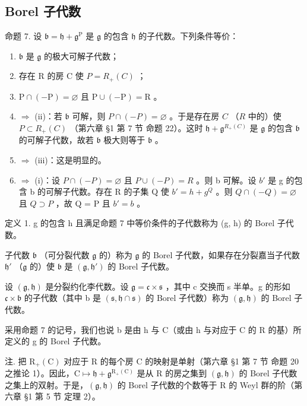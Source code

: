 \subsection{Borel 子代数}

命题 7. 设 \(\mathfrak{b} = \mathfrak{h} + \mathfrak{g}^{\mathrm{P}}\) 是 \(\mathfrak{g}\) 的包含 \(\mathfrak{h}\) 的子代数。下列条件等价：

\begin{enumerate}
\def\labelenumi{(\roman{enumi})}
\item
  \(\mathfrak{b}\) 是 \(\mathfrak{g}\) 的极大可解子代数；
\item
  存在 R 的房 C 使 \(P = R_{+}(C)\) ；
\item
  \(\mathrm{P} \cap (-\mathrm{P}) = \varnothing\) 且 \(\mathrm{P} \cup (-\mathrm{P}) = \mathrm{R}\) 。
\item
  \(\Longrightarrow\) (ii)：若 \(\mathfrak{b}\) 可解，则 \(P \cap (-P) = \varnothing\) 。于是存在房 \(C\) （\(R\) 中的）使 \(P \subset R_{+}(C)\) （第六章 §1 第 7 节 命题 22）。这时 \(\mathfrak{h} + \mathfrak{g}^{R_{+}(C)}\) 是 \(\mathfrak{g}\) 的包含 \(\mathfrak{b}\) 的可解子代数，故若 \(\mathfrak{b}\) 极大则等于 \(\mathfrak{b}\) 。
\item
  \(\Longrightarrow\) (iii)：这是明显的。
\item
  \(\Longrightarrow\) (i)：设 \(P \cap (-P) = \varnothing\) 且 \(P \cup (-P) = R\) 。则 b 可解。设 \(b'\) 是 g 的包含 b 的可解子代数。存在 R 的子集 Q 使 \(b' = h + g^{Q}\) 。则 \(Q \cap (-Q) = \varnothing\) 且 \(Q \supset P\) ，故 Q = P 且 \(b' = b\) 。
\end{enumerate}

定义 1. g 的包含 h 且满足命题 7 中等价条件的子代数称为 (g, h) 的 Borel 子代数。

子代数 \(\mathfrak{b}\) （可分裂代数 \(\mathfrak{g}\) 的）称为 \(\mathfrak{g}\) 的 Borel 子代数，如果存在分裂嘉当子代数 \(\mathfrak{h}'\) （\(\mathfrak{g}\) 的）使 \(\mathfrak{b}\) 是 \((\mathfrak{g},\mathfrak{h}')\) 的 Borel 子代数。

设 \((\mathfrak{g},\mathfrak{h})\) 是分裂约化李代数。设 \(\mathfrak{g}=\mathfrak{c}\times\mathfrak{s}\) ，其中 c 交换而 s 半单。g 的形如 \(\mathfrak{c}\times\mathfrak{b}\) 的子代数（其中 b 是 \((\mathfrak{s},\mathfrak{h}\cap\mathfrak{s})\) 的 Borel 子代数）称为 \((\mathfrak{g},\mathfrak{h})\) 的 Borel 子代数。

采用命题 7 的记号，我们也说 b 是由 h 与 C（或由 h 与对应于 C 的 R 的基）所定义的 g 的 Borel 子代数。

注. 把 \(\mathrm{R}_{+}(\mathrm{C})\) 对应于 R 的每个房 C 的映射是单射（第六章 §1 第 7 节 命题 20 之推论 1）。因此，\(\mathrm{C} \mapsto \mathfrak{h} + \mathfrak{g}^{\mathrm{R}_{+}(\mathrm{C})}\) 是从 R 的房之集到 \((\mathfrak{g}, \mathfrak{h})\) 的 Borel 子代数之集上的双射。于是，\((\mathfrak{g}, \mathfrak{h})\) 的 Borel 子代数的个数等于 R 的 Weyl 群的阶（第六章 §1 第 5 节 定理 2）。

